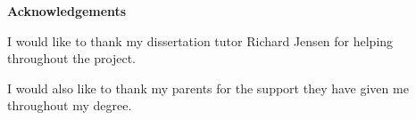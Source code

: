 \thispagestyle{empty}

\begin{center}
    {\LARGE\bf Acknowledgements}
\end{center}

I would like to thank my dissertation tutor Richard Jensen for helping throughout the project.

I would also like to thank my parents for the support they have given me throughout my degree.

